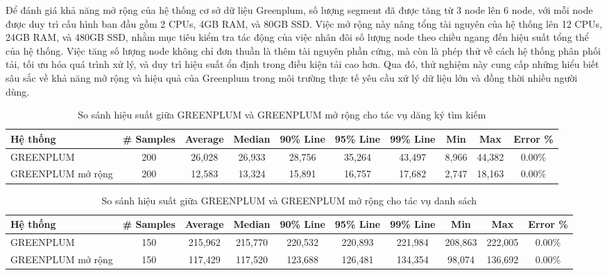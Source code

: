 \documentclass{article}[14pt]
\begin{document}
Để đánh giá khả năng mở rộng của hệ thống cơ sở dữ liệu Greenplum, số lượng segment đã được tăng từ 3 node lên 6 node, với mỗi node được duy trì cấu hình ban đầu gồm 2 CPUs, 4GB RAM, và 80GB SSD. Việc mở rộng này nâng tổng tài nguyên của hệ thống lên 12 CPUs, 24GB RAM, và 480GB SSD, nhằm mục tiêu kiểm tra tác động của việc nhân đôi số lượng node theo chiều ngang đến hiệu suất tổng thể của hệ thống. Việc tăng số lượng node không chỉ đơn thuần là thêm tài nguyên phần cứng, mà còn là phép thử về cách hệ thống phân phối tải, tối ưu hóa quá trình xử lý, và duy trì hiệu suất ổn định trong điều kiện tải cao hơn. Qua đó, thử nghiệm này cung cấp những hiểu biết sâu sắc về khả năng mở rộng và hiệu quả của Greenplum trong môi trường thực tế yêu cầu xử lý dữ liệu lớn và đồng thời nhiều người dùng.

\begin{table}[htbp]
\centering
\renewcommand{\arraystretch}{1.2} %
\setlength{\tabcolsep}{2pt} %
\begin{tabular}{|l|c|c|c|c|c|c|c|c|c|}
\hline
\textbf{Hệ thống} & \textbf{\# Samples} & \textbf{Average} & \textbf{Median} & \textbf{90\% Line} & \textbf{95\% Line} & \textbf{99\% Line} & \textbf{Min} & \textbf{Max} & \textbf{Error \%} \\ \hline
GREENPLUM & 200 & 26,028 & 26,933 & 28,756 & 35,264 & 43,497 & 8,966 & 44,382 & 0.00\% \\ \hline
GREENPLUM mở rộng & 200 & 12,583 & 13,324 & 15,891 & 16,757 & 17,682 & 2,747 & 18,163 & 0.00\% \\ \hline
\end{tabular}
\caption{So sánh hiệu suất giữa GREENPLUM và GREENPLUM mở rộng cho tác vụ dăng ký tìm kiếm}
\label{tab:greenplum_extended_comparison_search}
\end{table}

\begin{table}[htbp]
\centering
\renewcommand{\arraystretch}{1.2} %
\setlength{\tabcolsep}{1.5pt} %
\begin{tabular}{|l|c|c|c|c|c|c|c|c|c|}
\hline
\textbf{Hệ thống} & \textbf{\# Samples} & \textbf{Average} & \textbf{Median} & \textbf{90\% Line} & \textbf{95\% Line} & \textbf{99\% Line} & \textbf{Min} & \textbf{Max} & \textbf{Error \%} \\ \hline
GREENPLUM & 150 & 215,962 & 215,770 & 220,532 & 220,893 & 221,984 & 208,863 & 222,005 & 0.00\% \\ \hline
GREENPLUM mở rộng & 150 & 117,429 & 117,520 & 123,688 & 126,481 & 134,354 & 98,074 & 136,692 & 0.00\% \\ \hline
\end{tabular}
\caption{So sánh hiệu suất giữa GREENPLUM và GREENPLUM mở rộng cho tác vụ danh sách}
\label{tab:greenplum_extended_comparison_list}
\end{table}
\end{document}
